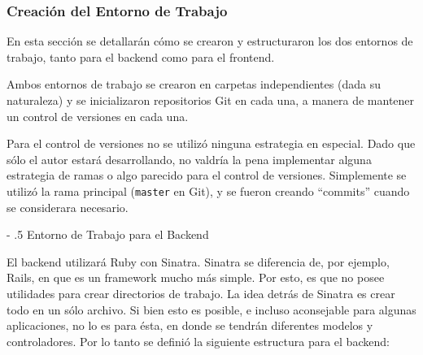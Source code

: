 \documentclass[12pt,titlepage,]{article}
\makeatletter
\renewcommand\paragraph{%
   \@startsection{paragraph}{4}{0mm}%
      {-\baselineskip}%
      {.5\baselineskip}%
      {\normalfont\normalsize\bfseries}}
\makeatother
\begin{document}
\subsubsection{Creación del Entorno de Trabajo}

En esta sección se detallarán cómo se crearon y estructuraron los dos
entornos de trabajo, tanto para el backend como para el frontend.

Ambos entornos de trabajo se crearon en carpetas independientes (dada su
naturaleza) y se inicializaron repositorios Git en cada una, a manera de
mantener un control de versiones en cada una.

Para el control de versiones no se utilizó ninguna estrategia en
especial. Dado que sólo el autor estará desarrollando, no valdría la
pena implementar alguna estrategia de ramas o algo parecido para el
control de versiones. Simplemente se utilizó la rama principal
(\texttt{master} en Git), y se fueron creando ``commits'' cuando se
considerara necesario.

\paragraph{Entorno de Trabajo para el Backend}

El backend utilizará Ruby con Sinatra. Sinatra se diferencia de, por
ejemplo, Rails, en que es un framework mucho más simple. Por esto, es
que no posee utilidades para crear directorios de trabajo. La idea
detrás de Sinatra es crear todo en un sólo archivo. Si bien esto es
posible, e incluso aconsejable para algunas aplicaciones, no lo es para
ésta, en donde se tendrán diferentes modelos y controladores. Por lo
tanto se definió la siguiente estructura para el backend:
\end{document}

